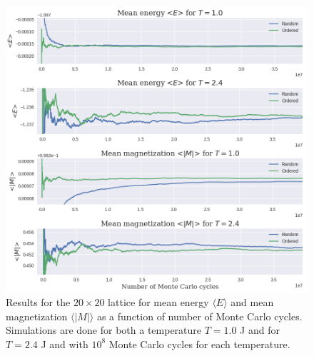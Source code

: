 \documentclass[12pt]{article}
\numberwithin{figure}{section}
\numberwithin{table}{section}
\begin{document}
\begin{figure}[ht]
 \centerline{\includegraphics[scale = 0.60]{20x20_EM}}
 \caption{Results for the $20\times20$ lattice for mean energy $\langle E \rangle$ and mean magnetization $\langle |M| \rangle$ as a function of number of Monte Carlo cycles. Simulations are done for both a temperature $T=1.0$ J and for $T=2.4$ J and with $10^8$ Monte Carlo cycles for each temperature.}
 \label{fig:20x20_EM}
\end{figure}
\end{document}
